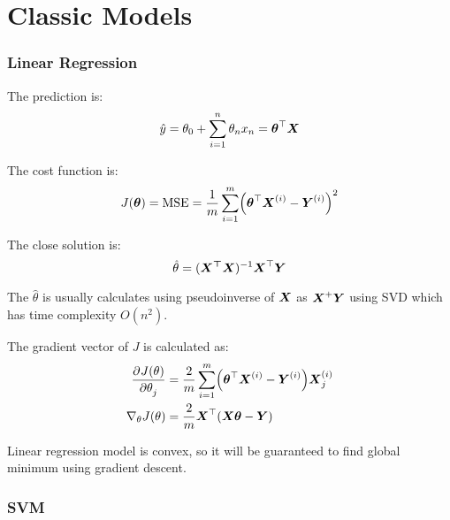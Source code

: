
\chapter{Classic Models}



\subsection{Linear Regression}

The prediction is:
\begin{equation}
    \hat{y} = \theta_0 + \sum_{i=1}^n \theta_n x_n = \boldsymbol{\theta}^\top \boldsymbol{X}
\end{equation}

The cost function is:
\begin{equation}
    J(\columnvector{\theta} ) = \text{MSE} = \frac{1}{m} \sum_{i=1}^m \mleft(\columnvector{\theta}^\top  \subscription{X}{i} - \subscription{Y}{i} \mright)^2
\end{equation}

The close solution is:
\begin{equation}
    \hat{\theta} = (\boldsymbol{{X}^\top \boldsymbol{X}} )^{-1} \boldsymbol{X}^\top \boldsymbol{Y}
\end{equation}

The $\hat{\theta}$ is usually calculates using pseudoinverse of $\boldsymbol{X}$ as $\boldsymbol{{X}}^{+} \boldsymbol{Y}$ using SVD which has time complexity $O(n^2)$. 


The gradient vector of $J$ is calculated as:
\begin{equation}
    \begin{aligned}
    \dpd{J(\theta)}{\theta_j} &= \frac{2}{m} \sum_{i=1}^m \mleft( \columnvector{\theta}^\top \subscription{X}{i} - \subscription{Y}{i} \mright) \subscription{X}{i}_j \\
    \nabla_\theta J(\theta) &= \frac{2}{m} \columnvector{X}^\top (\columnvector{X} \columnvector{\theta} - \columnvector{Y} )
    \end{aligned}
\end{equation}



Linear regression model is convex, so it will be guaranteed to find global minimum using gradient descent.



\subsection{SVM}

